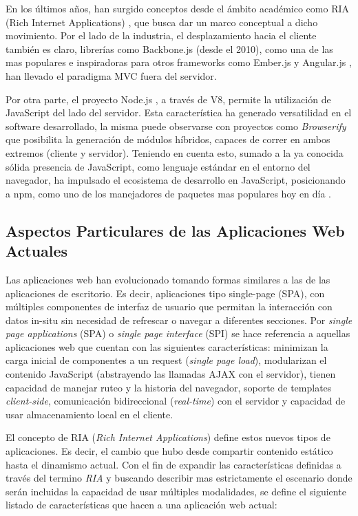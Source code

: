En los últimos años, han surgido conceptos desde el ámbito académico como RIA (Rich Internet Applications) \citep{Fraternali2010}, que busca dar un marco conceptual a dicho movimiento. Por el lado de la industria, el desplazamiento hacia el cliente también es claro, librerías como Backbone.js \citep{ind:backbone} (desde el 2010), como una de las mas populares e inspiradoras para otros frameworks como Ember.js \citep{ind:ember} y Angular.js \citep{ind:angular}, han llevado el paradigma MVC fuera del servidor.

Por otra parte, el proyecto Node.js \citep{infra:nodejs}, a través de V8, permite la utilización de JavaScript del lado del servidor. Esta característica ha generado versatilidad en el software desarrollado, la misma puede observarse con proyectos como \emph{Browserify} \citep{infra:browserify} que posibilita la generación de módulos híbridos, capaces de correr en ambos extremos (cliente y servidor). Teniendo en cuenta esto, sumado a la ya conocida sólida presencia de JavaScript, como lenguaje estándar en el entorno del navegador, ha impulsado el ecosistema de desarrollo en JavaScript, posicionando a npm, como uno de los manejadores de paquetes mas populares hoy en día \citep{infra:npm-mods}. 

\subsection{Aspectos Particulares de las Aplicaciones Web Actuales}

Las aplicaciones web han evolucionado tomando formas similares a las de las aplicaciones de escritorio. Es decir, aplicaciones tipo single-page (SPA), con  múltiples componentes de interfaz de usuario que permitan la interacción con datos in-situ sin necesidad de refrescar o navegar a diferentes secciones.
Por \emph{single page applications} (SPA) o \emph{single page interface} (SPI)\citep{infra:spamanifesto} se hace referencia a aquellas aplicaciones web que cuentan con las siguientes características: minimizan la carga inicial de componentes a un request (\emph{single page load}), modularizan el contenido JavaScript (abstrayendo las llamadas AJAX con el servidor), tienen capacidad de manejar ruteo y la historia del navegador, soporte de templates \emph{client-side}, comunicación bidireccional (\emph{real-time}) con el servidor y capacidad de usar almacenamiento local en el cliente. 

El concepto de RIA (\emph{Rich Internet Applications}) define estos nuevos tipos de aplicaciones. Es decir, el cambio que hubo desde compartir contenido estático hasta el dinamismo actual.
Con el fin de expandir las características definidas a través del termino \emph{RIA} y buscando describir mas estrictamente el escenario donde serán incluidas la capacidad de usar múltiples modalidades, se define el siguiente listado de características que hacen a una aplicación web actual:

